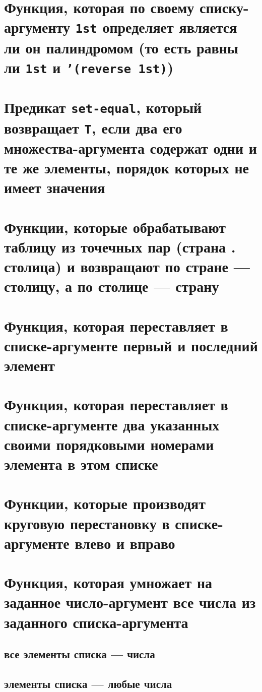
\section{Функция, которая по своему списку-аргументу \texttt{1st} определяет является ли он палиндромом (то есть равны ли \texttt{1st} и \texttt{'(reverse 1st)})}



\section{Предикат \texttt{set-equal}, который возвращает \texttt{T}, если два его множества-аргумента содержат одни и те же элементы, порядок которых не имеет значения}



\section{Функции, которые обрабатывают таблицу из точечных пар (страна . столица) и возвращают по стране --- столицу, а по столице --- страну}



\section{Функция, которая переставляет в списке-аргументе первый и последний элемент}



\section{Функция, которая переставляет в списке-аргументе два указанных своими порядковыми номерами элемента в этом списке}



\section{Функции, которые производят круговую перестановку в списке-аргументе влево и вправо}



\section{Функция, которая умножает на заданное число-аргумент все числа из заданного списка-аргумента}


\subsection{все элементы списка --- числа}


\subsection{элементы списка --- любые числа}